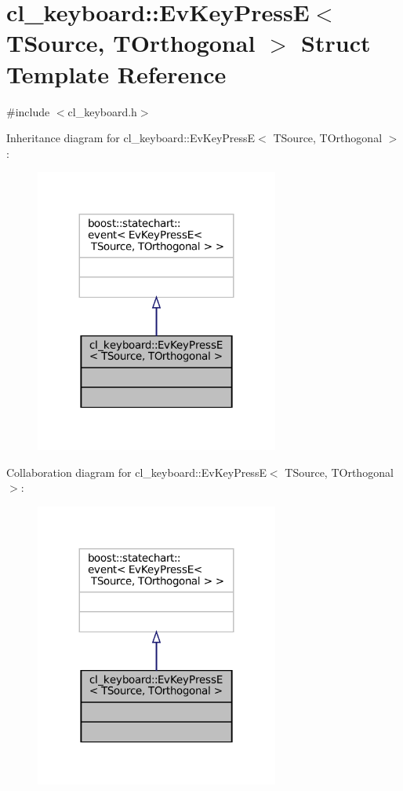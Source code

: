 \hypertarget{structcl__keyboard_1_1EvKeyPressE}{}\section{cl\+\_\+keyboard\+:\+:Ev\+Key\+PressE$<$ T\+Source, T\+Orthogonal $>$ Struct Template Reference}
\label{structcl__keyboard_1_1EvKeyPressE}


{\ttfamily \#include $<$cl\+\_\+keyboard.\+h$>$}



Inheritance diagram for cl\+\_\+keyboard\+:\+:Ev\+Key\+PressE$<$ T\+Source, T\+Orthogonal $>$\+:
\nopagebreak
\begin{figure}[H]
\begin{center}
\leavevmode
\includegraphics[width=227pt]{structcl__keyboard_1_1EvKeyPressE__inherit__graph}
\end{center}
\end{figure}


Collaboration diagram for cl\+\_\+keyboard\+:\+:Ev\+Key\+PressE$<$ T\+Source, T\+Orthogonal $>$\+:
\nopagebreak
\begin{figure}[H]
\begin{center}
\leavevmode
\includegraphics[width=227pt]{structcl__keyboard_1_1EvKeyPressE__coll__graph}
\end{center}
\end{figure}


